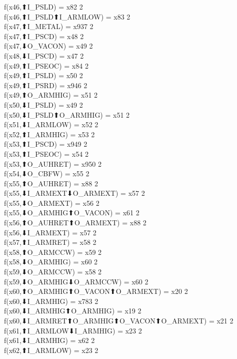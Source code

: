 f(x46,⬆I_PSLD) = x82 {2} \\
f(x46,⬆I_PSLD⬆I_ARMLOW) = x83 {2} \\
f(x47,⬆I_METAL) = x937 {2} \\
f(x47,⬆I_PSCD) = x48 {2} \\
f(x47,⬇O_VACON) = x49 {2} \\
f(x48,⬇I_PSCD) = x47 {2} \\
f(x49,⬆I_PSEOC) = x84 {2} \\
f(x49,⬆I_PSLD) = x50 {2} \\
f(x49,⬆I_PSRD) = x946 {2} \\
f(x49,⬆O_ARMHIG) = x51 {2} \\
f(x50,⬇I_PSLD) = x49 {2} \\
f(x50,⬇I_PSLD⬆O_ARMHIG) = x51 {2} \\
f(x51,⬇I_ARMLOW) = x52 {2} \\
f(x52,⬆I_ARMHIG) = x53 {2} \\
f(x53,⬆I_PSCD) = x949 {2} \\
f(x53,⬆I_PSEOC) = x54 {2} \\
f(x53,⬆O_AUHRET) = x950 {2} \\
f(x54,⬇O_CBFW) = x55 {2} \\
f(x55,⬆O_AUHRET) = x88 {2} \\
f(x55,⬇I_ARMEXT⬇O_ARMEXT) = x57 {2} \\
f(x55,⬇O_ARMEXT) = x56 {2} \\
f(x55,⬇O_ARMHIG⬆O_VACON) = x61 {2} \\
f(x56,⬆O_AUHRET⬆O_ARMEXT) = x88 {2} \\
f(x56,⬇I_ARMEXT) = x57 {2} \\
f(x57,⬆I_ARMRET) = x58 {2} \\
f(x58,⬆O_ARMCCW) = x59 {2} \\
f(x58,⬇O_ARMHIG) = x60 {2} \\
f(x59,⬇O_ARMCCW) = x58 {2} \\
f(x59,⬇O_ARMHIG⬇O_ARMCCW) = x60 {2} \\
f(x60,⬆O_ARMHIG⬆O_VACON⬆O_ARMEXT) = x20 {2} \\
f(x60,⬇I_ARMHIG) = x783 {2} \\
f(x60,⬇I_ARMHIG⬆O_ARMHIG) = x19 {2} \\
f(x60,⬇I_ARMRET⬆O_ARMHIG⬆O_VACON⬆O_ARMEXT) = x21 {2} \\
f(x61,⬆I_ARMLOW⬇I_ARMHIG) = x23 {2} \\
f(x61,⬇I_ARMHIG) = x62 {2} \\
f(x62,⬆I_ARMLOW) = x23 {2} \\
